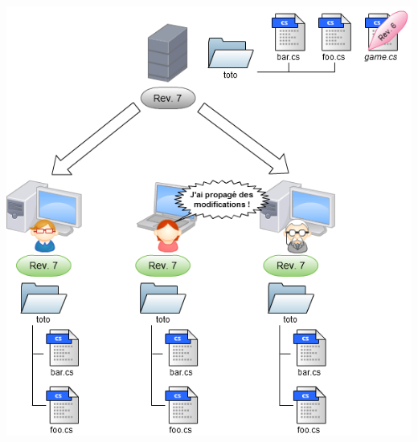 \begin{frame}
  \begin{center}
    \includegraphics[scale=0.3]{images/11-Update.png}
  \end{center}
\end{frame}

